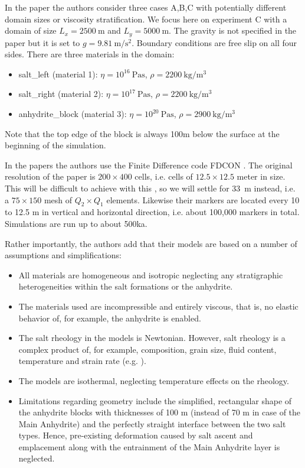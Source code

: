 In the paper the authors consider three cases A,B,C with potentially 
different domain sizes or viscosity stratification. We focus here on 
experiment C with a domain of size $L_x=2500~\si{\meter}$
and $L_y=5000~\si{\meter}$. The gravity is not specified in the paper 
but it is set to $g=9.81~\si{\meter\per\square\second}$. Boundary conditions 
are free slip on all four sides. There are three materials in the domain: 
\begin{itemize}
\item salt\_left (material 1): $\eta=10^{16}~\si{\pascal\second}$, $\rho=2200~\si{\kg\per\cubic\meter}$
\item salt\_right (material 2):  $\eta=10^{17}~\si{\pascal\second}$, $\rho=2200~\si{\kg\per\cubic\meter}$
\item anhydrite\_block (material 3): $\eta=10^{20}~\si{\pascal\second}$, $\rho=2900~\si{\kg\per\cubic\meter}$
\end{itemize}
Note that the top edge of the block is always 100m below the surface 
at the beginning of the simulation. 

In the papers the authors use the Finite Difference code  FDCON \cite{wesc92}.
The original resolution of the paper is $200 \times 400$ cells,
i.e. cells of $12.5 \times 12.5$ meter in size.
This will be difficult to achieve with this \stone, so we will settle for 33~m instead, i.e.
a $75 \times 150$ mesh of $Q_2\times Q_1$ elements.
Likewise their markers are located
every 10 to 12.5 m in vertical and horizontal direction, i.e. about 100,000 markers in total.
Simulations are run up to about 500ka.

Rather importantly, the authors add that their models are based on a number of assumptions and simplifications:

\begin{itemize}
\item All materials are homogeneous and isotropic neglecting any stratigraphic heterogeneities within the
salt formations or the anhydrite. 
\item The materials used are incompressible and entirely viscous, that is, 
no elastic behavior of, for example, the anhydrite is enabled. 
\item The salt rheology in the models is
Newtonian. However, salt rheology is a complex product of, for
example, composition, grain size, fluid content, temperature and
strain rate (e.g. \cite{ursz86,vasv93,javs94}). 
\item The models are isothermal, neglecting temperature effects on the rheology. 
\item Limitations regarding geometry include the simplified, rectangular shape of the anhydrite blocks
with thicknesses of 100 m (instead of 70 m in case of the Main
Anhydrite) and the perfectly straight interface between the two salt
types. Hence, pre-existing deformation caused by salt ascent and
emplacement along with the entrainment of the Main Anhydrite layer is neglected.
\end{itemize}



